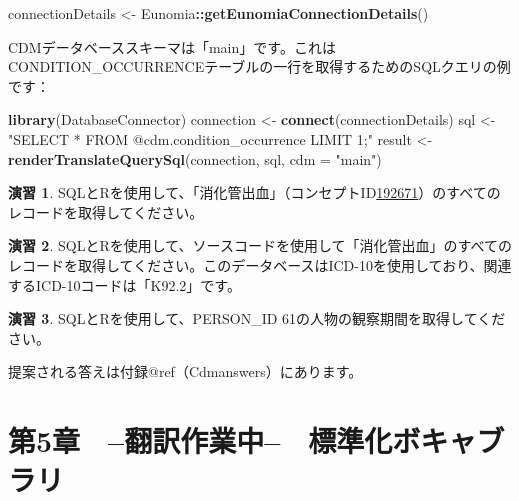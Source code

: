 \documentclass[
  11pt]{book}
\newenvironment{Shaded}{\begin{snugshade}}{\end{snugshade}}
\newcommand{\AttributeTok}[1]{\textcolor[rgb]{0.13,0.29,0.53}{#1}}
\newcommand{\FunctionTok}[1]{\textcolor[rgb]{0.13,0.29,0.53}{\textbf{#1}}}
\newcommand{\NormalTok}[1]{#1}
\newcommand{\OtherTok}[1]{\textcolor[rgb]{0.56,0.35,0.01}{#1}}
\newcommand{\SpecialCharTok}[1]{\textcolor[rgb]{0.81,0.36,0.00}{\textbf{#1}}}
\newcommand{\StringTok}[1]{\textcolor[rgb]{0.31,0.60,0.02}{#1}}
\theoremstyle{definition}
\theoremstyle{definition}
\theoremstyle{definition}
\newtheorem{exercise}{演習}[chapter]
\theoremstyle{definition}
\theoremstyle{remark}
\begin{document}
\begin{Shaded}
\begin{Highlighting}[]
\NormalTok{connectionDetails }\OtherTok{\textless{}{-}}\NormalTok{ Eunomia}\SpecialCharTok{::}\FunctionTok{getEunomiaConnectionDetails}\NormalTok{()}
\end{Highlighting}
\end{Shaded}

CDMデータベーススキーマは「main」です。これはCONDITION\_OCCURRENCEテーブルの一行を取得するためのSQLクエリの例です：

\begin{Shaded}
\begin{Highlighting}[]
\FunctionTok{library}\NormalTok{(DatabaseConnector)}
\NormalTok{connection }\OtherTok{\textless{}{-}} \FunctionTok{connect}\NormalTok{(connectionDetails)}
\NormalTok{sql }\OtherTok{\textless{}{-}} \StringTok{"SELECT *}
\StringTok{FROM @cdm.condition\_occurrence}
\StringTok{LIMIT 1;"}
\NormalTok{result }\OtherTok{\textless{}{-}} \FunctionTok{renderTranslateQuerySql}\NormalTok{(connection, sql, }\AttributeTok{cdm =} \StringTok{"main"}\NormalTok{)}
\end{Highlighting}
\end{Shaded}

\begin{exercise}
\protect\hypertarget{exr:exerciseGiBleedRecords}{}\label{exr:exerciseGiBleedRecords}SQLとRを使用して、「消化管出血」（コンセプトID\href{http://athena.ohdsi.org/search-terms/terms/192671}{192671}）のすべてのレコードを取得してください。
\end{exercise}

\begin{exercise}
\protect\hypertarget{exr:exercisePersonSource}{}\label{exr:exercisePersonSource}SQLとRを使用して、ソースコードを使用して「消化管出血」のすべてのレコードを取得してください。このデータベースはICD-10を使用しており、関連するICD-10コードは「K92.2」です。
\end{exercise}

\begin{exercise}
\protect\hypertarget{exr:exercisePerson61Records}{}\label{exr:exercisePerson61Records}SQLとRを使用して、PERSON\_ID 61の人物の観察期間を取得してください。
\end{exercise}

提案される答えは付録@ref（Cdmanswers）にあります。

\chapter{第5章　--翻訳作業中--　標準化ボキャブラリ}\label{StandardizedVocabularies}
\end{document}
